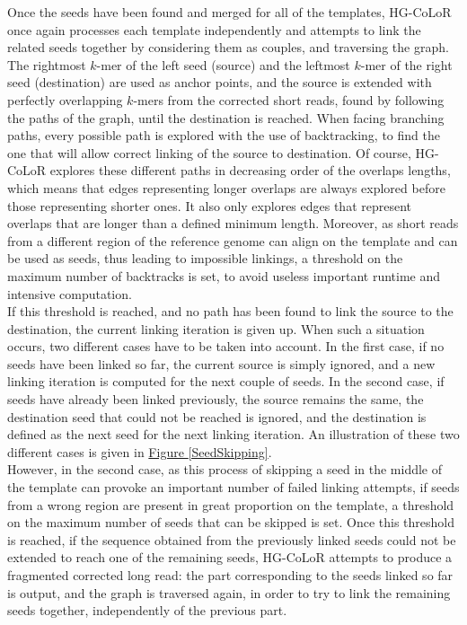 \documentclass[long, final]{jobim2017}
\begin{document}
Once the seeds have been found and merged for all of the templates, HG-CoLoR once again processes each template independently and attempts to link the related seeds together by considering them as couples, and traversing the graph. The rightmost $k$-mer of the left seed (source) and the leftmost $k$-mer of the right seed (destination) are used as anchor points, and the source is extended with perfectly overlapping $k$-mers from the corrected short reads, found by following the paths of the graph, until the destination is reached. When facing branching paths, every possible path is explored with the use of backtracking, to find the one that will allow correct linking of the source to destination. Of course, HG-CoLoR explores these different paths in decreasing order of the overlaps lengths, which means that edges representing longer overlaps are always explored before those representing shorter ones. It also only explores edges that represent overlaps that are longer than a defined minimum length. Moreover, as short reads from a different region of the reference genome can align on the template and can be used as seeds, thus leading to impossible linkings, a threshold on the maximum number of backtracks is set, to avoid useless important runtime and intensive computation. \\
\indent If this threshold is reached, and no path has been found to link the source to the destination, the current linking iteration is given up. When such a situation occurs, two different cases have to be taken into account. In the first case, if no seeds have been linked so far, the current source is simply ignored, and a new linking iteration is computed for the next couple of seeds. In the second case, if seeds have already been linked previously, the source remains the same, the destination seed that could not be reached is ignored, and the destination is defined as the next seed for the next linking iteration. An illustration of these two different cases is given in
\hyperref[SeedSkipping]{Figure \ref*{SeedSkipping}}. \\
\indent However, in the second case, as this process of skipping a seed in the middle of the template can provoke an important number of failed linking attempts, if seeds from a wrong region are present in great proportion on the template, a threshold on the maximum number of seeds that can be skipped is set. 
Once this threshold is reached, if the sequence obtained from the previously linked seeds could not be extended to reach one of the remaining seeds, HG-CoLoR attempts to produce a fragmented corrected long read: the part corresponding to the seeds linked so far is output, and the graph is traversed again, in order to try to link the remaining seeds together, independently of the previous part.
\end{document}
